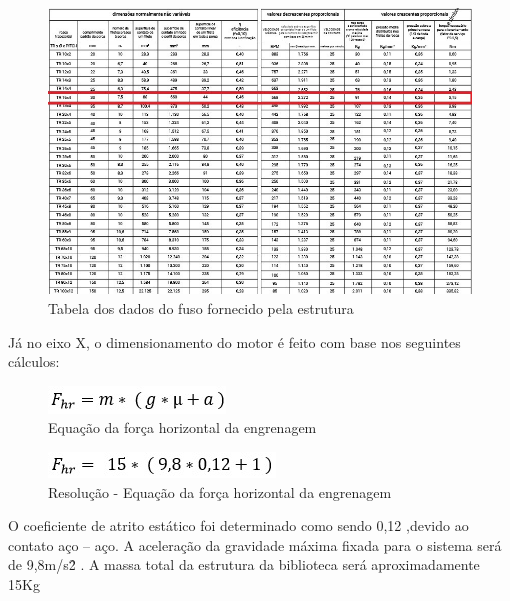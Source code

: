 \begin{figure}[!h]
\centering
\includegraphics[scale=0.8, angle = 360]{figuras/tabela_escolha_do_motor}
\caption[]{Tabela dos dados do fuso fornecido pela estrutura}
\label{Tabela dos dados do fuso fornecido pela estrutura}
\end{figure}
\FloatBarrier

Já no eixo X, o dimensionamento do motor é feito com base nos seguintes cálculos:

\begin{figure}[!h]
\centering
\includegraphics[scale=0.8, angle = 360]{figuras/formula1}
\caption[]{Equação da força horizontal da engrenagem}
\label{Equação da força horizontal da engrenagem}
\end{figure}
\FloatBarrier

\begin{figure}[!h]
\centering
\includegraphics[scale=0.8, angle = 360]{figuras/formula2}
\caption[]{Resolução - Equação da força horizontal da engrenagem}
\label{Resolução - Equação da força horizontal da engrenagem}
\end{figure}
\FloatBarrier

O coeficiente de atrito estático foi determinado como sendo 0,12 ,devido ao contato aço – aço. A aceleração da gravidade máxima fixada para o sistema será de 9,8m/s\^2 . A massa total da estrutura da biblioteca será aproximadamente 15Kg

